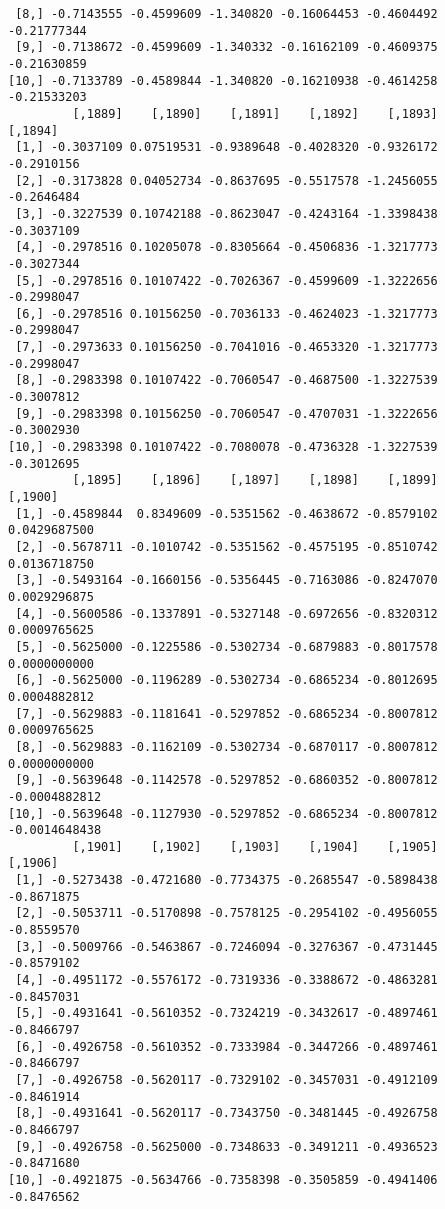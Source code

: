 \documentclass[
  letterpaper,
  DIV=11,
  numbers=noendperiod]{scrreprt}
\begin{document}
\begin{verbatim}
 [8,] -0.7143555 -0.4599609 -1.340820 -0.16064453 -0.4604492 -0.21777344
 [9,] -0.7138672 -0.4599609 -1.340332 -0.16162109 -0.4609375 -0.21630859
[10,] -0.7133789 -0.4589844 -1.340820 -0.16210938 -0.4614258 -0.21533203
         [,1889]    [,1890]    [,1891]    [,1892]    [,1893]    [,1894]
 [1,] -0.3037109 0.07519531 -0.9389648 -0.4028320 -0.9326172 -0.2910156
 [2,] -0.3173828 0.04052734 -0.8637695 -0.5517578 -1.2456055 -0.2646484
 [3,] -0.3227539 0.10742188 -0.8623047 -0.4243164 -1.3398438 -0.3037109
 [4,] -0.2978516 0.10205078 -0.8305664 -0.4506836 -1.3217773 -0.3027344
 [5,] -0.2978516 0.10107422 -0.7026367 -0.4599609 -1.3222656 -0.2998047
 [6,] -0.2978516 0.10156250 -0.7036133 -0.4624023 -1.3217773 -0.2998047
 [7,] -0.2973633 0.10156250 -0.7041016 -0.4653320 -1.3217773 -0.2998047
 [8,] -0.2983398 0.10107422 -0.7060547 -0.4687500 -1.3227539 -0.3007812
 [9,] -0.2983398 0.10156250 -0.7060547 -0.4707031 -1.3222656 -0.3002930
[10,] -0.2983398 0.10107422 -0.7080078 -0.4736328 -1.3227539 -0.3012695
         [,1895]    [,1896]    [,1897]    [,1898]    [,1899]       [,1900]
 [1,] -0.4589844  0.8349609 -0.5351562 -0.4638672 -0.8579102  0.0429687500
 [2,] -0.5678711 -0.1010742 -0.5351562 -0.4575195 -0.8510742  0.0136718750
 [3,] -0.5493164 -0.1660156 -0.5356445 -0.7163086 -0.8247070  0.0029296875
 [4,] -0.5600586 -0.1337891 -0.5327148 -0.6972656 -0.8320312  0.0009765625
 [5,] -0.5625000 -0.1225586 -0.5302734 -0.6879883 -0.8017578  0.0000000000
 [6,] -0.5625000 -0.1196289 -0.5302734 -0.6865234 -0.8012695  0.0004882812
 [7,] -0.5629883 -0.1181641 -0.5297852 -0.6865234 -0.8007812  0.0009765625
 [8,] -0.5629883 -0.1162109 -0.5302734 -0.6870117 -0.8007812  0.0000000000
 [9,] -0.5639648 -0.1142578 -0.5297852 -0.6860352 -0.8007812 -0.0004882812
[10,] -0.5639648 -0.1127930 -0.5297852 -0.6865234 -0.8007812 -0.0014648438
         [,1901]    [,1902]    [,1903]    [,1904]    [,1905]    [,1906]
 [1,] -0.5273438 -0.4721680 -0.7734375 -0.2685547 -0.5898438 -0.8671875
 [2,] -0.5053711 -0.5170898 -0.7578125 -0.2954102 -0.4956055 -0.8559570
 [3,] -0.5009766 -0.5463867 -0.7246094 -0.3276367 -0.4731445 -0.8579102
 [4,] -0.4951172 -0.5576172 -0.7319336 -0.3388672 -0.4863281 -0.8457031
 [5,] -0.4931641 -0.5610352 -0.7324219 -0.3432617 -0.4897461 -0.8466797
 [6,] -0.4926758 -0.5610352 -0.7333984 -0.3447266 -0.4897461 -0.8466797
 [7,] -0.4926758 -0.5620117 -0.7329102 -0.3457031 -0.4912109 -0.8461914
 [8,] -0.4931641 -0.5620117 -0.7343750 -0.3481445 -0.4926758 -0.8466797
 [9,] -0.4926758 -0.5625000 -0.7348633 -0.3491211 -0.4936523 -0.8471680
[10,] -0.4921875 -0.5634766 -0.7358398 -0.3505859 -0.4941406 -0.8476562

\end{verbatim}
\end{document}
